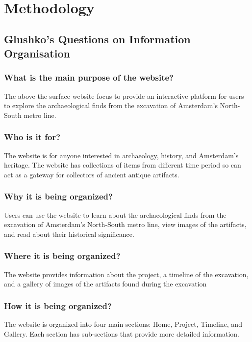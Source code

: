 \section {Methodology}

\subsection{Glushko's Questions on Information Organisation}

\subsubsection{What is the main purpose of the website?}
The above the surface website focus to provide an interactive platform for users to explore the archaeological finds from the excavation of Amsterdam’s North-South metro line.

\subsubsection{Who is it for?}
The website is for anyone interested in archaeology, history, and Amsterdam’s heritage. The website has collections of items from different time period so can act as a gateway for collectors of ancient antique artifacts.

\subsubsection{Why it is being organized?}
Users can use the website to learn about the archaeological finds from the excavation of Amsterdam’s North-South metro line, view images of the artifacts, and read about their historical significance.

\subsubsection{Where it is being organized?}
The website provides information about the project, a timeline of the excavation, and a gallery of images of the artifacts found during the excavation

\subsubsection{How it is being organized?}
The website is organized into four main sections: Home, Project, Timeline, and Gallery. Each section has sub-sections that provide more detailed information.

